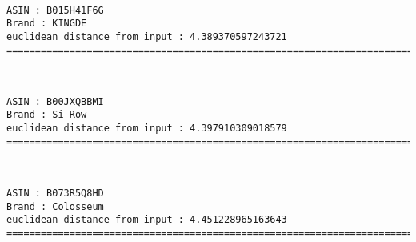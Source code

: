 \documentclass[11pt]{article}
\begin{document}
    
    
    \begin{center}
    \end{center}
    { \hspace*{\fill} \\}
    
    \begin{Verbatim}[commandchars=\\\{\}]
ASIN : B015H41F6G
Brand : KINGDE
euclidean distance from input : 4.389370597243721
=============================================================================================================================

    \end{Verbatim}

    
    
    \begin{center}
    \end{center}
    { \hspace*{\fill} \\}
    
    \begin{Verbatim}[commandchars=\\\{\}]
ASIN : B00JXQBBMI
Brand : Si Row
euclidean distance from input : 4.397910309018579
=============================================================================================================================

    \end{Verbatim}

    
    
    \begin{center}
    \end{center}
    { \hspace*{\fill} \\}
    
    \begin{Verbatim}[commandchars=\\\{\}]
ASIN : B073R5Q8HD
Brand : Colosseum
euclidean distance from input : 4.451228965163643
=============================================================================================================================

    \end{Verbatim}
\end{document}
